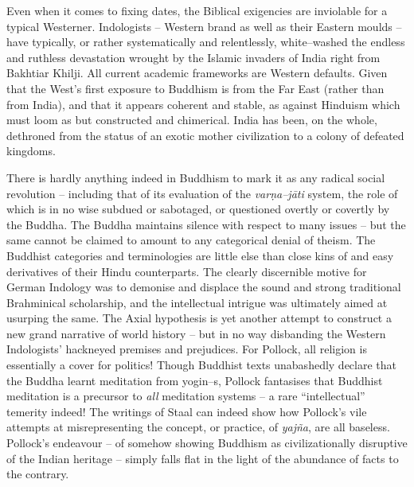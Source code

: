 Even when it comes to fixing dates, the Biblical exigencies are inviolable for a typical Westerner. Indologists – Western brand as well as their Eastern moulds – have typically, or rather systematically and relentlessly, white–washed the endless and ruthless devastation wrought by the Islamic invaders of India right from Bakhtiar Khilji. All current academic frameworks are Western defaults. Given that the West's first exposure to Buddhism is from the Far East (rather than from India), and that it appears coherent and stable, as against Hinduism which must loom as but constructed and chimerical. India has been, on the whole, dethroned from the status of an exotic mother civilization to a colony of defeated kingdoms.

There is hardly anything indeed in Buddhism to mark it as any radical social revolution – including that of its evaluation of the \textit{varṇa–jāti} system, the role of which is in no wise subdued or sabotaged, or questioned overtly or covertly by the Buddha. The Buddha maintains silence with respect to many issues – but the same cannot be claimed to amount to any categorical denial of theism. The Buddhist categories and terminologies are little else than close kins of and easy derivatives of their Hindu counterparts. The clearly discernible motive for German Indology was to demonise and displace the sound and strong traditional Brahminical scholarship, and the intellectual intrigue was ultimately aimed at usurping the same. The Axial hypothesis is yet another attempt to construct a new grand narrative of world history – but in no way disbanding the Western Indologists’ hackneyed premises and prejudices. For Pollock, all religion is essentially a cover for politics! Though Buddhist texts unabashedly declare that the Buddha learnt meditation from yogin–s, Pollock fantasises that Buddhist meditation is a precursor to \textit{all} meditation systems – a rare “intellectual” temerity indeed! The writings of Staal can indeed show how Pollock’s vile attempts at misrepresenting the concept, or practice, of \textit{yajña}, are all baseless. Pollock’s endeavour – of somehow showing Buddhism as civilizationally disruptive of the Indian heritage – simply falls flat in the light of the abundance of facts to the contrary.

